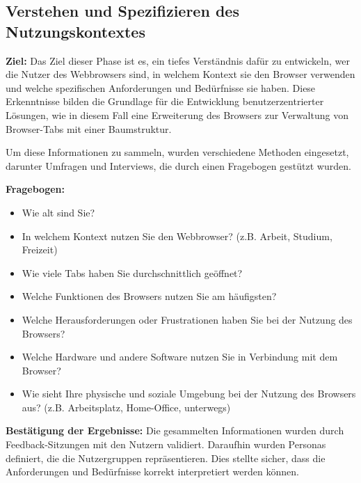 \subsection{Verstehen und Spezifizieren des Nutzungskontextes}

\textbf{Ziel:} 
Das Ziel dieser Phase ist es, ein tiefes Verständnis dafür zu entwickeln, wer die Nutzer des Webbrowsers sind, in welchem Kontext sie den Browser verwenden und welche spezifischen Anforderungen und Bedürfnisse sie haben. 
Diese Erkenntnisse bilden die Grundlage für die Entwicklung benutzerzentrierter Lösungen, wie in diesem Fall eine Erweiterung des Browsers zur Verwaltung von Browser-Tabs mit einer Baumstruktur.

Um diese Informationen zu sammeln, wurden verschiedene Methoden eingesetzt, darunter Umfragen und Interviews, die durch einen Fragebogen gestützt wurden.

\textbf{Fragebogen:}
\begin{itemize}
    \item Wie alt sind Sie?
    \item In welchem Kontext nutzen Sie den Webbrowser? (z.B. Arbeit, Studium, Freizeit)
    \item Wie viele Tabs haben Sie durchschnittlich geöffnet?
    \item Welche Funktionen des Browsers nutzen Sie am häufigsten?
    \item Welche Herausforderungen oder Frustrationen haben Sie bei der Nutzung des Browsers?
    \item Welche Hardware und andere Software nutzen Sie in Verbindung mit dem Browser?
    \item Wie sieht Ihre physische und soziale Umgebung bei der Nutzung des Browsers aus? (z.B. Arbeitsplatz, Home-Office, unterwegs)
\end{itemize}

\textbf{Bestätigung der Ergebnisse:}
Die gesammelten Informationen wurden durch Feedback-Sitzungen mit den Nutzern validiert. 
Daraufhin wurden Personas definiert, die die Nutzergruppen repräsentieren. 
Dies stellte sicher, dass die Anforderungen und Bedürfnisse korrekt interpretiert werden können.

